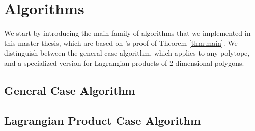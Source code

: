 %
%

\section{Algorithms}\label{sec:algorithms}

We start by introducing the main family of algorithms that we implemented in this master thesis, which are based on \cite{HK2017}'s proof of Theorem \ref{thm:main}. 
We distinguish between the general case algorithm, which applies to any polytope, and a specialized version for Lagrangian products of 2-dimensional polygons.

\subsection{General Case Algorithm}\label{subsec:general-case-algorithm}


\subsection{Lagrangian Product Case Algorithm}\label{subsec:lagrangian-product-algorithm}


